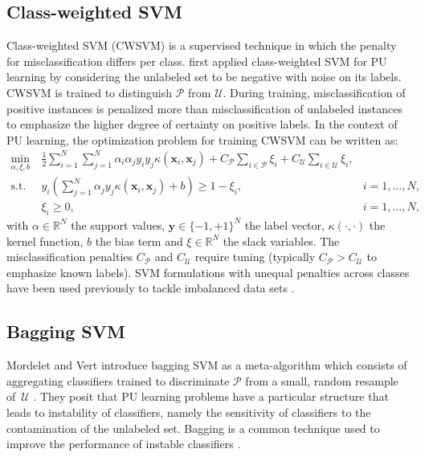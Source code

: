 \documentclass[preprint,elsarticle-num,12pt]{elsarticle}
\begin{document}
\subsection{Class-weighted SVM} \label{bsvm}
Class-weighted SVM (CWSVM) is a supervised technique in which the penalty for misclassification differs per class. \citet{Liu:2003:BTC:951949.952139} first applied class-weighted SVM for PU learning by considering the unlabeled set to be negative with noise on its labels. CWSVM is trained to distinguish $\mathcal{P}$ from $\mathcal{U}$. During training, misclassification of positive instances is penalized more than misclassification of unlabeled instances to emphasize the higher degree of certainty on positive labels. In the context of PU learning, the optimization problem for training CWSVM can be written as:
\begin{align}
\min_{\alpha,\xi,b}\ & \frac{1}{2}\sum_{i=1}^N\sum_{j=1}^N \alpha_i\alpha_j y_i y_j \kappa(\mathbf{x}_i,\mathbf{x}_j)+C_{\mathcal{P}}\sum_{i \in\mathcal{P}} \xi_i + C_{\mathcal{U}}\sum_{i\in\mathcal{U}} \xi_i, \label{eq:bsvm} \\
\text{s.t. } &y_i(\sum_{j=1}^N \alpha_j y_j \kappa(\mathbf{x}_i,\mathbf{x}_j)+b)\geq 1-\xi_i, &i=1,\ldots,N, \nonumber \\
&\xi_i \geq 0, &i=1,\ldots,N, \nonumber
\end{align}
with $\alpha \in \mathbb{R}^N$ the support values, $\mathbf{y} \in \{-1,+1\}^N$ the label vector, $\kappa(\cdot,\cdot)$ the kernel function, $b$ the bias term and $\xi \in \mathbb{R}^N$ the slack variables. The misclassification penalties $C_{\mathcal{P}}$ and $C_{\mathcal{U}}$ require tuning (typically $C_{\mathcal{P}} > C_{\mathcal{U}}$ to emphasize known labels). SVM formulations with unequal penalties across classes have been used previously to tackle imbalanced data sets \citep{osuna1997}. 

\subsection{Bagging SVM} \label{baggingsvm}
Mordelet and Vert introduce bagging SVM as a meta-algorithm which consists of aggregating classifiers trained to discriminate $\mathcal{P}$ from a small, random resample of\ $\mathcal{U}$ \citep{mordelet2014bagging}. They posit that PU learning problems have a particular structure that leads to instability of classifiers, namely the sensitivity of classifiers to the contamination of the unlabeled set.  Bagging is a common technique used to improve the performance of instable classifiers \citep{Breiman:1996:BP:231986.231989}.
\end{document}
